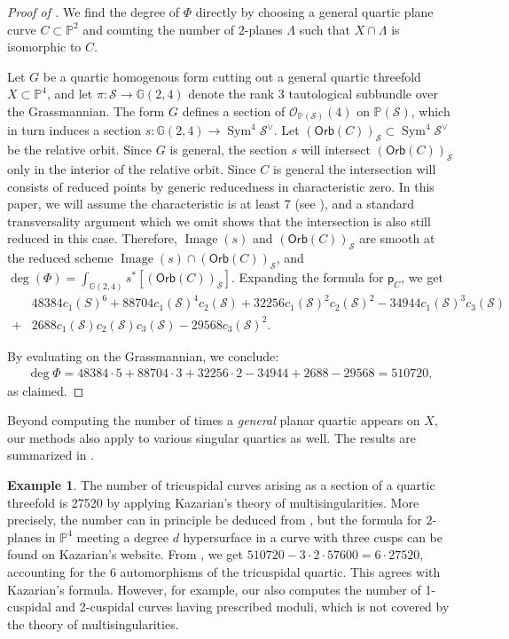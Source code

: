 \documentclass[12 pt, reqno]{amsart}
\theoremstyle{definition}
\newtheorem{exmp}[thm]{Example}
\newcommand{\on}{\operatorname}
\newcommand{\mb}{\mathbb}
\newcommand{\mc}{\mathcal}
\newcommand{\ms}{\mathscr}
\newcommand{\Orb}{\mathsf{Orb}}
\newcommand{\p}{\mathsf{p}}
\begin{document}
\begin{proof}[Proof of ]
  We find the degree of $\Phi$ directly by choosing a general quartic
  plane curve $C\subset \mb{P}^2$ and counting the number of
  $2$-planes $\Lambda$ such that $X\cap \Lambda$ is isomorphic to $C$.

  Let $G$ be a quartic homogenous form cutting out a general quartic
  threefold $X\subset \mb{P}^4$, and let $\pi: \mc{S}\to \mb{G}(2,4)$
  denote the rank $3$ tautological subbundle over the
  Grassmannian. The form $G$ defines a section of
  $\ms{O}_{\mb{P}(\mc{S})}(4)$ on $\mb{P}(\mc{S})$, which in turn
  induces a section $s: \mb{G}(2,4)\to \on{Sym}^4\mc{S}^{\vee}$. Let
  $(\Orb(C))_{\mc{S}} \subset \on{Sym}^4\mc{S}^{\vee}$ be the
  relative orbit.  Since $G$ is general, the section $s$ will
  intersect $(\Orb(C))_{\mc{S}}$ only in the interior of the relative
  orbit. Since $C$ is general the intersection will consists of
  reduced points by generic reducedness in characteristic zero. In
  this paper, we will assume the characteristic is at least 7 (see
  ), and a standard transversality argument which we
  omit shows that the intersection is also still reduced in this
  case. Therefore, $\on{Image}(s)$ and $(\Orb(C))_{\mc{S}} $ are
  smooth at the reduced scheme
  $\on{Image}(s)\cap (\Orb(C))_{\mc{S}} $, and
  $\deg(\Phi)=\int_{\mb{G}(2,4)}s^{*}[(\Orb(C))_{\mc{S}} ]$.
  Expanding the formula for $\p_C$, we get
\begin{align*}
  &48384 c_{1}(S)^6 + 88704 c_{1}(\mc{S})^4 c_{2}(\mc{S}) + 32256 c_{1}(\mc{S})^2 c_{2}(\mc{S})^2 - 34944 c_{1}(\mc{S})^3 c_{3}(\mc{S})\\ + 
  &2688 c_{1}(\mc{S}) c_{2}(\mc{S}) c_{3}(\mc{S}) - 29568 c_{3}(\mc{S})^2.
\end{align*}

By evaluating on the Grassmannian, we conclude:
\begin{align*}
  \deg \Phi =  48384 \cdot 5 + 88704 \cdot 3 + 32256 \cdot 2 - 34944 + 2688 - 29568 = 510720, 
\end{align*}
as claimed.
\end{proof}

Beyond computing the number of times a {\sl general} planar quartic
appears on $X$, our methods also apply to various singular quartics as
well. The results are summarized in .

\begin{exmp}
  The number of tricuspidal curves arising as a section of a quartic
  threefold is 27520 by applying Kazarian's theory of
  multisingularities. More precisely, the number can in principle be
  deduced from \cite[Section 8]{K03}, but the formula for $2$-planes in
  $\mb{P}^4$ meeting a degree $d$ hypersurface in a curve with three
  cusps can be found on Kazarian's website. From ,
  we get $510720 - 3\cdot 2\cdot57600=6\cdot 27520$, accounting for
  the 6 automorphisms of the tricuspidal quartic.  This agrees with
  Kazarian's formula. However, for example, our 
  also computes the number of 1-cuspidal and 2-cuspidal curves having
  prescribed moduli, which is not covered by the theory of
  multisingularities.
\end{exmp}
\end{document}
